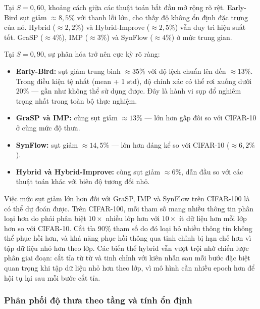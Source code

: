         Tại $S=0{,}60$, khoảng cách giữa các thuật toán bắt đầu mở rộng rõ rệt.
        Early-Bird sụt giảm $\approx8{,}5\%$ với thanh lỗi lớn, cho thấy độ không ổn định đặc
        trưng của nó.
        Hybrid ($\approx2{,}2\%$) và Hybrid-Improve ($\approx2{,}5\%$) vẫn duy trì hiệu suất tốt.
        GraSP ($\approx4\%$), IMP ($\approx3\%$) và SynFlow ($\approx4\%$) ở mức trung gian.
        
        Tại $S=0{,}90$, sự phân hóa trở nên cực kỳ rõ ràng:
        \begin{itemize}
            \item \textbf{Early-Bird:} sụt giảm trung bình $\approx35\%$ với độ lệch chuẩn lên
            đến $\approx13\%$. Trong điều kiện tệ nhất (mean + 1 std), độ chính xác có thể rơi
            xuống dưới $20\%$ --- gần như không thể sử dụng được. Đây là hành vi sụp đổ nghiêm
            trọng nhất trong toàn bộ thực nghiệm.
            \item \textbf{GraSP và IMP:} cùng sụt giảm $\approx13\%$ --- lớn hơn gấp đôi so với
            CIFAR-10 ở cùng mức độ thưa.
            \item \textbf{SynFlow:} sụt giảm $\approx14{,}5\%$ --- lớn hơn đáng kể so với CIFAR-10
            ($\approx6{,}2\%$).
            \item \textbf{Hybrid và Hybrid-Improve:} cùng sụt giảm $\approx6\%$, dẫn đầu so với các
            thuật toán khác với biên độ tương đối nhỏ.
        \end{itemize}
        
        Việc mức sụt giảm lớn hơn đối với GraSP, IMP và SynFlow trên CIFAR-100 là có thể dự đoán được.
        Trên CIFAR-100, mỗi tham số mang nhiều thông tin phân loại hơn
        do phải phân biệt $10\times$ nhiều lớp hơn với $10\times$ ít dữ liệu hơn mỗi lớp hơn so với CIFAR-10.
        Cắt tỉa $90\%$ tham số do đó loại bỏ nhiều thông tin không thể phục hồi hơn, và khả năng
        phục hồi thông qua tinh chỉnh bị hạn chế hơn vì tập dữ liệu nhỏ hơn theo lớp.
        Các biến thể hybrid vẫn vượt trội nhờ chiến lược phân giai đoạn: cắt tỉa từ từ và tinh
        chỉnh với kiên nhẫn sau mỗi bước đặc biệt quan trọng khi tập dữ liệu nhỏ hơn theo lớp,
        vì mô hình cần nhiều epoch hơn để hội tụ lại sau mỗi bước cắt tỉa.
        
        \subsubsection{Phân phối độ thưa theo tầng và tính ổn định}
        \label{subsec:r20c100_layerwise}

